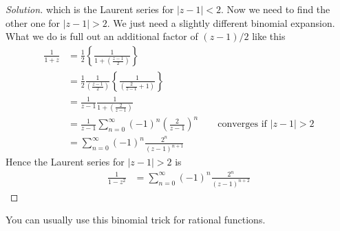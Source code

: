 \begin{proof}[Solution]
    which is the Laurent series for $|z - 1|<2$.
    Now we need to find the other one for $|z - 1| > 2$.
    We just need a slightly different binomial expansion.
    What we do is full out an additional factor of $(z-1)/2$ like this
    \begin{align}
        \frac{1}{1 + z} &=
        \frac{1}{2}\left\{
            \frac{1}{1 + \left(\frac{z - 1}{2} \right)}
        \right\}\\
        &= \frac{1}{2} \frac{1}{\left(\frac{z - 1}{2} \right)}\left\{
            \frac{1}{\left(\frac{2}{z - 1} + 1 \right)}
        \right\}\\
        &= \frac{1}{z - 1} \frac{1}{1 + \left( \frac{2}{z - 1} \right)}\\
        &= \frac{1}{z - 1}\sum_{n = 0}^{\infty} (-1)^{n}\left(
        \frac{2}{z - 1}
        \right)^n \qquad\text{converges if }|z - 1| > 2\\
        &= \sum_{n=0}^{\infty} (-1)^n \frac{2^n}{(z - 1)^{n+1}}
    \end{align}
    Hence the Laurent series for $|z - 1|>2$ is
    \begin{align}
        \frac{1}{1 - z^2}
        &= \sum_{n=0}^{\infty} (-1)^n \frac{2^n}{(z - 1)^{n+2}}
    \end{align}
\end{proof}
You can usually use this binomial trick for rational functions.

